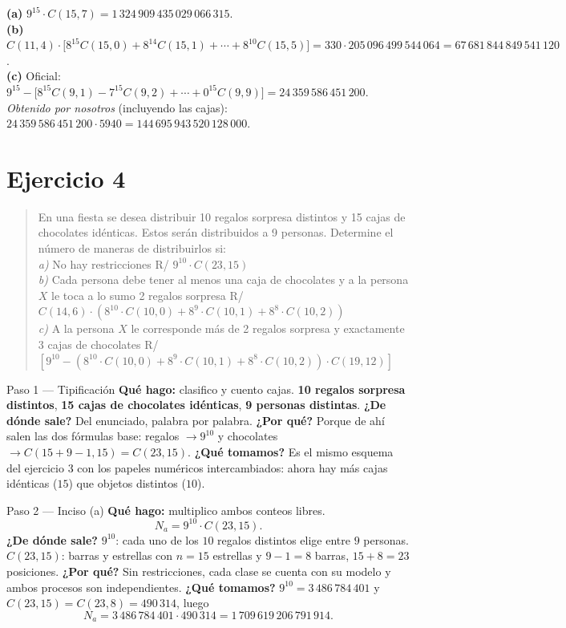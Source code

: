 \documentclass[11pt]{article}
\begin{document}
\begin{resp}
\textbf{(a)} $9^{15}\cdot C(15,7)=1\,324\,909\,435\,029\,066\,315$.\\
\textbf{(b)} $C(11,4)\cdot\bigl[8^{15}C(15,0)+8^{14}C(15,1)+\cdots+8^{10}C(15,5)\bigr]=330\cdot 205\,096\,499\,544\,064=67\,681\,844\,849\,541\,120$.\\
\textbf{(c)} Oficial: $9^{15}-\bigl[8^{15}C(9,1)-7^{15}C(9,2)+\cdots+0^{15}C(9,9)\bigr]=24\,359\,586\,451\,200$. \emph{Obtenido por nosotros} (incluyendo las cajas): $24\,359\,586\,451\,200\cdot 5940=144\,695\,943\,520\,128\,000$.
\end{resp}

\section*{Ejercicio 4}

\begin{quote}
En una fiesta se desea distribuir 10 regalos sorpresa distintos y 15 cajas de chocolates idénticas. Estos serán distribuidos a 9 personas. Determine el número de maneras de distribuirlos si:\\
\textit{a)} No hay restricciones \hfill R/ $9^{10}\cdot C(23,15)$\\
\textit{b)} Cada persona debe tener al menos una caja de chocolates y a la persona $X$ le toca a lo sumo 2 regalos sorpresa \hfill R/ $C(14,6)\cdot(8^{10}\cdot C(10,0)+8^9\cdot C(10,1)+8^8\cdot C(10,2))$\\
\textit{c)} A la persona $X$ le corresponde más de 2 regalos sorpresa y exactamente 3 cajas de chocolates \hfill R/ $[9^{10}-(8^{10}\cdot C(10,0)+8^9\cdot C(10,1)+8^8\cdot C(10,2))\cdot C(19,12)]$
\end{quote}

\begin{paso}{Paso 1 --- Tipificación}
\textbf{Qué hago:} clasifico y cuento cajas.
\textbf{10 regalos sorpresa distintos}, \textbf{15 cajas de chocolates idénticas}, \textbf{9 personas distintas}.
\textbf{¿De dónde sale?} Del enunciado, palabra por palabra.
\textbf{¿Por qué?} Porque de ahí salen las dos fórmulas base: regalos $\to 9^{10}$ y chocolates $\to C(15+9-1,15)=C(23,15)$.
\textbf{¿Qué tomamos?} Es el mismo esquema del ejercicio 3 con los papeles numéricos intercambiados: ahora hay más cajas idénticas ($15$) que objetos distintos ($10$).
\end{paso}

\begin{paso}{Paso 2 --- Inciso (a)}
\textbf{Qué hago:} multiplico ambos conteos libres.
\[
N_a=9^{10}\cdot C(23,15).
\]
\textbf{¿De dónde sale?} $9^{10}$: cada uno de los $10$ regalos distintos elige entre $9$ personas. $C(23,15)$: barras y estrellas con $n=15$ estrellas y $9-1=8$ barras, $15+8=23$ posiciones.
\textbf{¿Por qué?} Sin restricciones, cada clase se cuenta con su modelo y ambos procesos son independientes.
\textbf{¿Qué tomamos?} $9^{10}=3\,486\,784\,401$ y $C(23,15)=C(23,8)=490\,314$, luego
\[
N_a=3\,486\,784\,401\cdot 490\,314=1\,709\,619\,206\,791\,914 .
\]
\end{paso}
\end{document}

